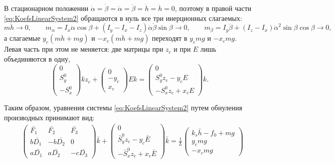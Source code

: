В стационарном положении $\dot{\alpha} = \dot{\beta} = \ddot{\alpha} = \ddot{\beta} = \dot{h} = \ddot{h} = 0$, поэтому в правой части \ref{eq:KoefsLinearSystem2} обращаются в нуль все три инерционных слагаемых:
\begin{equation}
\label{eq:StaticLimit}
m\ddot{h} \to 0, \qquad
m_{\alpha} = I_x\ddot{\alpha}\cos{\beta} + \left(I_y-I_x-I_z\right)\dot{\alpha}\dot{\beta}\sin{\beta} \to 0, \qquad
m_{\beta} = I_y\ddot{\beta} + \left(I_z-I_x\right)\dot{\alpha}^2\sin{\beta}\cos{\beta} \to 0,
\end{equation}
а слагаемые $y_c(m\ddot{h} + mg)$ и $-x_c(m\ddot{h} + mg)$ переходят в $y_cmg$ и $-x_cmg$. Левая часть при этом не меняется: две матрицы при $z_c$ и при $E$ лишь объединяются в одну,
\begin{equation}
\label{eq:StaticRegroup}
\begin{pmatrix}0 \\ S_y^0 \\ -S_x^0\end{pmatrix}kz_c +
\begin{pmatrix}0 \\ -y_c \\ x_c \end{pmatrix}Ek =
\begin{pmatrix}0 \\ S_y^0z_c - y_cE \\ -S_x^0z_c + x_cE\end{pmatrix}k .
\end{equation}

Таким образом, уравнения системы \ref{eq:KoefsLinearSystem2} путем обнуления производных принимают вид:
\begin{equation}
\label{eq:LinearSystemStatic}
\begin{aligned}
& \begin{pmatrix}
\bar{F_1} & \bar{F_2} & \bar{F_3} \\
b\bar{D_1} & -b\bar{D_2} & 0 \\
a\bar{D_1} & a\bar{D_2} & -c\bar{D_3}
\end{pmatrix}\bar{k} +
\begin{pmatrix}0 \\ \bar{S}_y^0z_c -y_c\bar{E} \\ -\bar{S}_x^0z_c+x_c\bar{E}\end{pmatrix}\bar{k} = \frac{1}{L}
\begin{pmatrix}
k_s\bar{h} - f_0 + mg \\
y_cmg \\-x_cmg
\end{pmatrix}
\end{aligned}
\end{equation}

